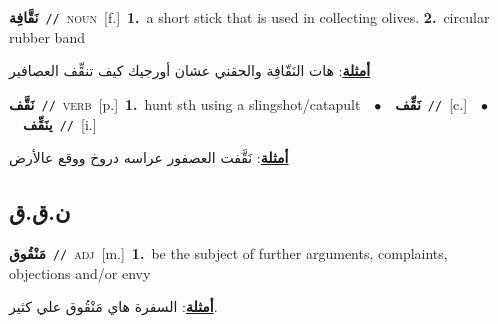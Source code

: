 \documentclass[10pt,a4paper,twoside]{article} %
\begin{document}
\begin{multicols}{2}
{\setlength\topsep{0pt}\textbf{\foreignlanguage{arabic}{نَقَّافِة}}\ {\color{gray}\texttt{//}\color{black}}\ \textsc{noun}\ [f.]\ \textbf{1.}~a short stick that is used in collecting olives.  \textbf{2.}~circular rubber band\  \begin{flushright}\color{gray}\foreignlanguage{arabic}{\textbf{\underline{\foreignlanguage{arabic}{أمثلة}}}: هات النَقّافِة والحقني عشان أورجيك كيف تنقِّف العصافير}\end{flushright}\color{black}} \vspace{2mm}

{\setlength\topsep{0pt}\textbf{\foreignlanguage{arabic}{نَقَّف}}\ {\color{gray}\texttt{//}\color{black}}\ \textsc{verb}\ [p.]\ \textbf{1.}~hunt sth using a slingshot/catapult\ \ $\bullet$\ \ \setlength\topsep{0pt}\textbf{\foreignlanguage{arabic}{نَقِّف}}\ {\color{gray}\texttt{//}\color{black}}\ [c.]\ \ $\bullet$\ \ \setlength\topsep{0pt}\textbf{\foreignlanguage{arabic}{ينَقِّف}}\ {\color{gray}\texttt{//}\color{black}}\ [i.]\  \begin{flushright}\color{gray}\foreignlanguage{arabic}{\textbf{\underline{\foreignlanguage{arabic}{أمثلة}}}: نَقَّفت العصفور عراسه دروخ ووقع عالأرض}\end{flushright}\color{black}} \vspace{2mm}

\vspace{-3mm}
\subsection*{\color{blue}\foreignlanguage{arabic}{ن.ق.ق}\color{blue}{}} 

{\setlength\topsep{0pt}\textbf{\foreignlanguage{arabic}{مَنْقُوق}}\ {\color{gray}\texttt{//}\color{black}}\ \textsc{adj}\ [m.]\ \textbf{1.}~be the subject of further arguments, complaints, objections and/or envy\  \begin{flushright}\color{gray}\foreignlanguage{arabic}{\textbf{\underline{\foreignlanguage{arabic}{أمثلة}}}: السفرة هاي مَنْقُوق علي كثير.}\end{flushright}\color{black}} \vspace{2mm}


\end{multicols}
\end{document}
